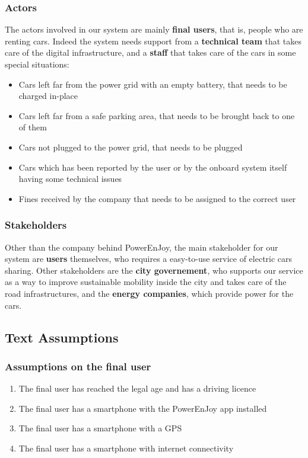 \documentclass[11pt]{article} %
\newcommand{\pe}{PowerEnJoy }
\newcommand{\pecomma}{PowerEnJoy, }
\begin{document}
\subsubsection{Actors}
The actors involved in our system are mainly \textbf{final users}, that is, people who are renting cars. Indeed the system needs support from a \textbf{technical team} that takes care of the digital infrastructure, and a \textbf{staff} that takes care of the cars in some special situations:
\begin{itemize} 
	\item Cars left far from the power grid with an empty battery, that needs to be charged in-place
	\item Cars left far from a safe parking area, that needs to be brought back to one of them
	\item Cars not plugged to the power grid, that needs to be plugged
	\item Cars which has been reported by the user or by the onboard system itself having some technical issues
	\item Fines received by the company that needs to be assigned to the correct user
\end{itemize}

\subsubsection{Stakeholders}
Other than the company behind \pecomma the main stakeholder for our system are \textbf{users} themselves, who requires a easy-to-use service of electric cars sharing. Other stakeholders are the \textbf{city governement}, who supports our service as a way to improve sustainable mobility inside the city and takes care of the road infrastructures, and the \textbf{energy companies}, which provide power for the cars.

\subsection{Text Assumptions}

\subsubsection{Assumptions on the final user}
\begin{enumerate}
	\item The final user has reached the legal age and has a driving licence
	\item The final user has a smartphone with the \pe app installed
	\item The final user has a smartphone with a GPS
	\item The final user has a smartphone with internet connectivity
\end{enumerate}
  
\end{document}
